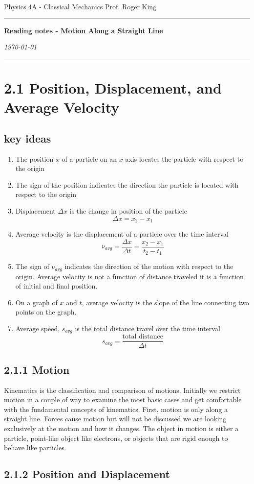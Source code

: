 \documentclass{article}
\begin{document}
\flushleft
Physics 4A - Classical Mechanics \hfill Prof. Roger King\\
\hrule

\begin{center}
    \vspace{14pt}
    \textbf{\LARGE Reading notes - Motion Along a Straight Line} \\
    \vspace{12pt}

    \textit{\today}
    \vspace{14pt}
\end{center}

\hrule

\section*{2.1 Position, Displacement, and Average Velocity}
\subsection*{key ideas}
\begin{enumerate}
	\item The position $x$ of a particle on an $x$ axis locates the particle with respect to the origin
	\item The sign of the position indicates the direction the particle is located with respect to the origin
	\item Displacement $\Delta x$ is the change in position of the particle
		\[
			\Delta x = x_2-x_1
		\]
	\item Average velocity is the displacement of a particle over the time interval
		\[
			\nu_{avg} = \frac{\Delta x}{\Delta t} = \frac{x_2 - x_1}{t_2 - t_1}
		\]
	\item The sign of $\nu_{avg}$ indicates the direction of the motion with respect to the origin. Average velocity is not a function of distance traveled it is a function of initial and final position.
	\item On a graph of $x$ and $t$, average velocity is the slope of the line connecting two points on the graph.
	\item Average speed, $s_{avg}$ is the total distance travel over the time interval
		\[
			s_{avg} = \frac{\text{total distance}}{\Delta t}
		\]
\end{enumerate}

\subsection*{2.1.1 Motion}
Kinematics is the classification and comparison of motions. Initially we restrict motion in a couple of way to examine the most basic cases and get comfortable with the fundamental concepts of kinematics. First, motion is only along a straight line. Forces cause motion but will not be discussed we are looking exclusively at the motion and how it changes. The object in motion is either a particle, point-like object like electrons, or objects that are rigid enough to behave like particles.

\subsection*{2.1.2 Position and Displacement}
\end{document}
